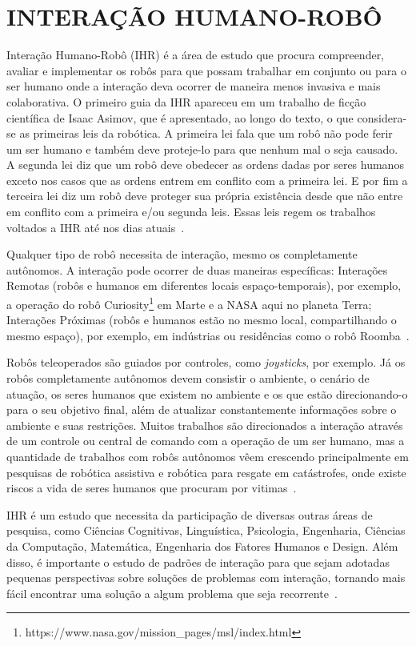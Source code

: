 \chapter{INTERAÇÃO HUMANO-ROBÔ}
\label{cap:ihr}
Interação Humano-Robô (IHR) é a área de estudo que procura compreender, avaliar e implementar os robôs para que possam trabalhar em conjunto ou para o ser humano onde a interação deva ocorrer de maneira menos invasiva e mais colaborativa. O primeiro guia da IHR apareceu em um trabalho de ficção científica de Isaac Asimov, que é apresentado, ao longo do texto, o que considera-se as primeiras leis da robótica. A primeira lei fala que um robô não pode ferir um ser humano e também deve proteje-lo para que nenhum mal o seja causado. A segunda lei diz que um robô deve obedecer as ordens dadas por seres humanos exceto nos casos que as ordens entrem em conflito com a primeira lei. E por fim a terceira lei diz um robô deve proteger sua própria existência desde que não entre em conflito com a primeira e/ou segunda leis. Essas leis regem os trabalhos voltados a IHR até nos dias atuais~\cite{goodrich:2007, weiss:2010}.

Qualquer tipo de robô necessita de interação, mesmo os completamente autônomos. A interação pode ocorrer de duas maneiras específicas: Interações Remotas (robôs e humanos em diferentes locais espaço-temporais), por exemplo, a operação do robô Curiosity\footnote{https://www.nasa.gov/mission\_pages/msl/index.html} em Marte e a NASA aqui no planeta Terra; Interações Próximas (robôs e humanos estão no mesmo local, compartilhando o mesmo espaço), por exemplo, em indústrias ou residências como o robô Roomba~\cite{goodrich:2007}.

Robôs teleoperados são guiados por controles, como \emph{joysticks}, por exemplo. Já os robôs completamente autônomos devem consistir o ambiente, o cenário de atuação, os seres humanos que existem no ambiente e os que estão direcionando-o para o seu objetivo final, além de atualizar constantemente informações sobre o ambiente e suas restrições. Muitos trabalhos são direcionados a interação através de um controle ou central de comando com a operação de um ser humano, mas a quantidade de trabalhos com robôs autônomos vêem crescendo principalmente em pesquisas de robótica assistiva e robótica para resgate em catástrofes, onde existe riscos a vida de seres humanos que procuram por vitimas~\cite{goodrich:2007, weiss:2010}.

IHR é um estudo que necessita da participação de diversas outras áreas de pesquisa, como Ciências Cognitivas, Linguística, Psicologia, Engenharia, Ciências da Computação, Matemática, Engenharia dos Fatores Humanos e Design. Além disso, é importante o estudo de padrões de interação para que sejam adotadas pequenas perspectivas sobre soluções de problemas com interação, tornando mais fácil encontrar uma solução a algum problema que seja recorrente~\cite{goodrich:2007}.


